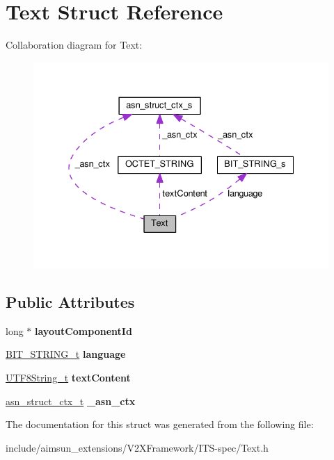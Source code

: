 \hypertarget{structText}{}\section{Text Struct Reference}
\label{structText}


Collaboration diagram for Text\+:\nopagebreak
\begin{figure}[H]
\begin{center}
\leavevmode
\includegraphics[width=334pt]{structText__coll__graph}
\end{center}
\end{figure}
\subsection*{Public Attributes}
\begin{DoxyCompactItemize}
\item 
long $\ast$ {\bfseries layout\+Component\+Id}\hypertarget{structText_abffb0fa7bf139f5eb86ecb48690a9507}{}\label{structText_abffb0fa7bf139f5eb86ecb48690a9507}

\item 
\hyperlink{structBIT__STRING__s}{B\+I\+T\+\_\+\+S\+T\+R\+I\+N\+G\+\_\+t} {\bfseries language}\hypertarget{structText_a21fd217a192e298be7d582be48d22e29}{}\label{structText_a21fd217a192e298be7d582be48d22e29}

\item 
\hyperlink{structOCTET__STRING}{U\+T\+F8\+String\+\_\+t} {\bfseries text\+Content}\hypertarget{structText_ac91fc4df42e0ecad235a659df9532584}{}\label{structText_ac91fc4df42e0ecad235a659df9532584}

\item 
\hyperlink{structasn__struct__ctx__s}{asn\+\_\+struct\+\_\+ctx\+\_\+t} {\bfseries \+\_\+asn\+\_\+ctx}\hypertarget{structText_a6c1f455d40b001b4cbc83f82b158ed3c}{}\label{structText_a6c1f455d40b001b4cbc83f82b158ed3c}

\end{DoxyCompactItemize}


The documentation for this struct was generated from the following file\+:\begin{DoxyCompactItemize}
\item 
include/aimsun\+\_\+extensions/\+V2\+X\+Framework/\+I\+T\+S-\/spec/Text.\+h\end{DoxyCompactItemize}
